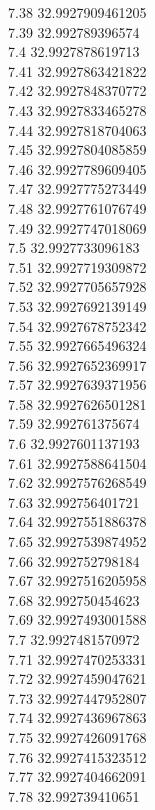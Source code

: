 {7.38	32.9927909461205\\
7.39	32.992789396574\\
7.4	32.9927878619713\\
7.41	32.9927863421822\\
7.42	32.9927848370772\\
7.43	32.9927833465278\\
7.44	32.9927818704063\\
7.45	32.9927804085859\\
7.46	32.9927789609405\\
7.47	32.9927775273449\\
7.48	32.9927761076749\\
7.49	32.9927747018069\\
7.5	32.9927733096183\\
7.51	32.9927719309872\\
7.52	32.9927705657928\\
7.53	32.9927692139149\\
7.54	32.9927678752342\\
7.55	32.9927665496324\\
7.56	32.9927652369917\\
7.57	32.9927639371956\\
7.58	32.9927626501281\\
7.59	32.992761375674\\
7.6	32.9927601137193\\
7.61	32.9927588641504\\
7.62	32.9927576268549\\
7.63	32.992756401721\\
7.64	32.9927551886378\\
7.65	32.9927539874952\\
7.66	32.992752798184\\
7.67	32.9927516205958\\
7.68	32.992750454623\\
7.69	32.9927493001588\\
7.7	32.9927481570972\\
7.71	32.9927470253331\\
7.72	32.9927459047621\\
7.73	32.9927447952807\\
7.74	32.9927436967863\\
7.75	32.9927426091768\\
7.76	32.9927415323512\\
7.77	32.9927404662091\\
7.78	32.992739410651\\
}
